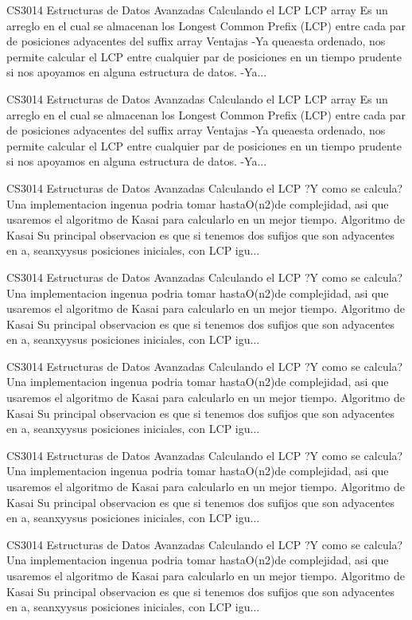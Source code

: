 \begin{description}[leftmargin=!,labelwidth=4.2em,style=nextline]
\item[Pag. 60] CS3014 Estructuras de Datos Avanzadas Calculando el LCP LCP array Es un arreglo en el cual se almacenan los Longest Common Prefix (LCP) entre cada par de posiciones adyacentes del suffix array Ventajas -Ya queaesta ordenado, nos permite calcular el LCP entre cualquier par de posiciones en un tiempo prudente si nos apoyamos en alguna estructura de datos. -Ya...
\item[Pag. 61] CS3014 Estructuras de Datos Avanzadas Calculando el LCP LCP array Es un arreglo en el cual se almacenan los Longest Common Prefix (LCP) entre cada par de posiciones adyacentes del suffix array Ventajas -Ya queaesta ordenado, nos permite calcular el LCP entre cualquier par de posiciones en un tiempo prudente si nos apoyamos en alguna estructura de datos. -Ya...
\item[Pag. 62] CS3014 Estructuras de Datos Avanzadas Calculando el LCP ?Y como se calcula? Una implementacion ingenua podria tomar hastaO(n2)de complejidad, asi que usaremos el algoritmo de Kasai para calcularlo en un mejor tiempo. Algoritmo de Kasai Su principal observacion es que si tenemos dos sufijos que son adyacentes en a, seanxyysus posiciones iniciales, con LCP igu...
\item[Pag. 63] CS3014 Estructuras de Datos Avanzadas Calculando el LCP ?Y como se calcula? Una implementacion ingenua podria tomar hastaO(n2)de complejidad, asi que usaremos el algoritmo de Kasai para calcularlo en un mejor tiempo. Algoritmo de Kasai Su principal observacion es que si tenemos dos sufijos que son adyacentes en a, seanxyysus posiciones iniciales, con LCP igu...
\item[Pag. 64] CS3014 Estructuras de Datos Avanzadas Calculando el LCP ?Y como se calcula? Una implementacion ingenua podria tomar hastaO(n2)de complejidad, asi que usaremos el algoritmo de Kasai para calcularlo en un mejor tiempo. Algoritmo de Kasai Su principal observacion es que si tenemos dos sufijos que son adyacentes en a, seanxyysus posiciones iniciales, con LCP igu...
\item[Pag. 65] CS3014 Estructuras de Datos Avanzadas Calculando el LCP ?Y como se calcula? Una implementacion ingenua podria tomar hastaO(n2)de complejidad, asi que usaremos el algoritmo de Kasai para calcularlo en un mejor tiempo. Algoritmo de Kasai Su principal observacion es que si tenemos dos sufijos que son adyacentes en a, seanxyysus posiciones iniciales, con LCP igu...
\item[Pag. 66] CS3014 Estructuras de Datos Avanzadas Calculando el LCP ?Y como se calcula? Una implementacion ingenua podria tomar hastaO(n2)de complejidad, asi que usaremos el algoritmo de Kasai para calcularlo en un mejor tiempo. Algoritmo de Kasai Su principal observacion es que si tenemos dos sufijos que son adyacentes en a, seanxyysus posiciones iniciales, con LCP igu...

\end{description}
